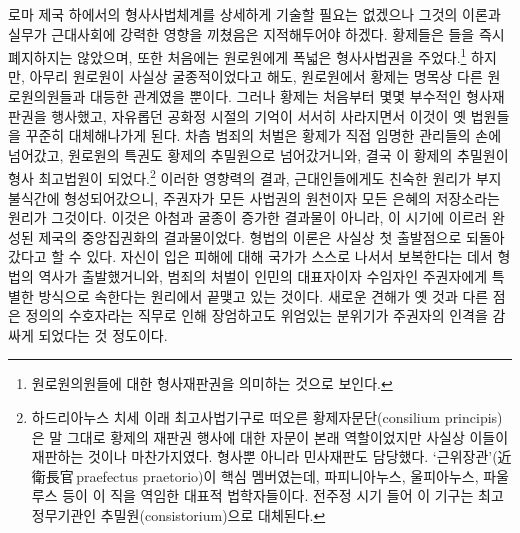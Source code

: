 로마 제국 하에서의 형사사법체계를
상세하게 기술할 필요는 없겠으나
그것의 이론과 실무가 근대사회에 강력한 영향을 끼쳤음은
지적해두어야 하겠다.
황제들은
들을 즉시 폐지하지는 않았으며,
또한
처음에는
원로원에게
폭넓은 형사사법권을
주었다.\footnote{%
  원로원의원들에 대한 형사재판권을 의미하는 것으로 보인다. }
하지만,
아무리
원로원이
사실상 굴종적이었다고 해도,
원로원에서 황제는
명목상
다른 원로원의원들과 대등한 관계였을 뿐이다.
그러나
황제는
처음부터
몇몇 부수적인 형사재판권을 행사했고,
자유롭던 공화정 시절의 기억이 서서히 사라지면서
이것이 옛 법원들을 꾸준히 대체해나가게 된다.
차츰
범죄의 처벌은
황제가 직접 임명한 관리들의 손에 넘어갔고,
\label{consiliumprincipis}%
원로원의 특권도 황제의 추밀원으로 넘어갔거니와,
결국 이 황제의 추밀원이 형사 최고법원이 되었다.\footnote{%
  하드리아누스 치세 이래 최고사법기구로 떠오른
  황제자문단(consilium principis)은
  말 그대로 황제의 재판권 행사에 대한 자문이 본래 역할이었지만
  사실상 이들이 재판하는 것이나 마찬가지였다.
  형사뿐 아니라 민사재판도 담당했다.
  `근위장관'(近衛長官\,praefectus praetorio)이 핵심 멤버였는데,
  파피니아누스, 울피아누스, 파울루스 등이 이 직을 역임한 대표적 법학자들이다.
  전주정 시기 들어 이 기구는 최고정무기관인 추밀원(consistorium)으로
  대체된다. }
이러한 영향력의 결과,
근대인들에게도 친숙한 원리가 부지불식간에 형성되어갔으니,
주권자가 모든 사법권의 원천이자 모든 은혜의 저장소라는 원리가 그것이다.
이것은 아첨과 굴종이 증가한 결과물이 아니라,
이 시기에 이르러 완성된 제국의 중앙집권화의 결과물이었다.
형법의 이론은 사실상 첫 출발점으로 되돌아갔다고 할 수 있다.
자신이 입은 피해에 대해 국가가 스스로 나서서 보복한다는 데서
형법의 역사가 출발했거니와,
범죄의 처벌이
인민의 대표자이자 수임자인 주권자에게
특별한 방식으로 속한다는 원리에서 끝맺고 있는 것이다.
새로운 견해가 옛 것과 다른 점은
정의의 수호자라는 직무로 인해
장엄하고도 위엄있는 분위기가
주권자의 인격을 감싸게 되었다는 것 정도이다.

